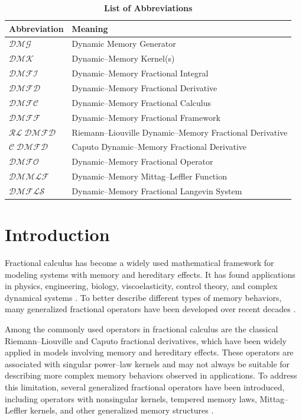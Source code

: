 \documentclass[11pt]{article}
\numberwithin{equation}{section}
\begin{document}
\begin{table}[h]
\raggedright
\caption*{\textbf{List of Abbreviations}}

\renewcommand{\arraystretch}{0.9}
\setlength{\tabcolsep}{5pt}
\small

\begin{tabular}{ll}
\hline
\textbf{Abbreviation} & \textbf{Meaning} \\
\hline
$\mathcal{DMG}$ & Dynamic Memory Generator \\
$\mathcal{DMK}$ & Dynamic--Memory Kernel(s) \\
$\mathcal{DMFI}$ & Dynamic--Memory Fractional Integral \\
$\mathcal{DMFD}$ & Dynamic--Memory Fractional Derivative \\
$\mathcal{DMFC}$ & Dynamic--Memory Fractional Calculus \\
$\mathcal{DMFF}$ & Dynamic--Memory Fractional Framework \\
$\mathcal{RL\;DMFD}$ & Riemann--Liouville Dynamic--Memory Fractional Derivative \\
$\mathcal{C\;DMFD}$ & Caputo Dynamic--Memory Fractional Derivative \\
$\mathcal{DMFO}$ & Dynamic--Memory Fractional Operator \\
$\mathcal{DMMLF}$ & Dynamic--Memory Mittag--Leffler Function \\
$\mathcal{DMFLS}$ & Dynamic--Memory Fractional Langevin System \\

\hline
\end{tabular}
\end{table}


\section{Introduction}

Fractional calculus has become a widely used mathematical framework for modeling systems with memory and hereditary effects. It has found applications in physics, engineering, biology, viscoelasticity, control theory, and complex dynamical systems \cite{Podlubny1999}. To better describe different types of memory behaviors, many generalized fractional operators have been developed over recent decades \cite{Kilbas2006}.

Among the commonly used operators in fractional calculus are the classical Riemann--Liouville and Caputo fractional derivatives, which have been widely applied in models involving memory and hereditary effects. These operators are associated with singular power--law kernels and may not always be suitable for describing more complex memory behaviors observed in applications. To address this limitation, several generalized fractional operators have been introduced, including operators with nonsingular kernels, tempered memory laws, Mittag--Leffler kernels, and other generalized memory structures \cite{CaputoFabrizio2015,AtanganaBaleanu2016,Baleanu2012,Diethelm2010,Garra2021,Giusti2020}.
\end{document}
